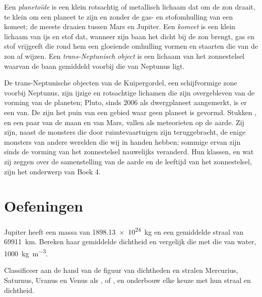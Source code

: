 \begin{definition}\label{def:b1:comparative-planetology:small-bodies}
Een \emph{planetoïde} is een klein rotsachtig of metallisch lichaam dat om de zon draait, te klein
om een planeet te zijn en zonder de gas- en stofomhulling van een komeet; de meeste draaien tussen Mars en Jupiter.
Een \emph{komeet} is een klein lichaam van ijs en stof dat, wanneer zijn baan het dicht bij de zon
brengt, gas en stof vrijgeeft die rond hem een gloeiende omhulling vormen en staarten die van de zon af wijzen. Een
\emph{trans-Neptunisch object} is een lichaam van het zonnestelsel waarvan de baan
gemiddeld voorbij die van Neptunus ligt.
\end{definition}

De trans-Neptunische objecten van de Kuipergordel, een schijfvormige zone voorbij Neptunus, zijn ijzige en
rotsachtige lichamen die zijn overgebleven van de vorming van de planeten; Pluto, sinds 2006 als dwergplaneet
aangemerkt, is er een van. De  zijn het puin van een gebied waar geen planeet is gevormd. Stukken
, en een paar van de maan en van Mars, vallen als meteorieten op de aarde. Zij zijn, naast de
monsters die door ruimtevaartuigen zijn teruggebracht, de enige monsters van andere werelden die wij in handen
hebben; sommige ervan zijn sinds de vorming van het zonnestelsel nauwelijks veranderd. Hun klassen, en wat zij
zeggen over de samenstelling van de aarde en de leeftijd van het zonnestelsel, zijn het onderwerp van Boek 4.

\section{Oefeningen}

\begin{exercise}[$\star$]\label{exo:b1:comparative-planetology:1}
Jupiter heeft een massa van \qty{1898.13e24}{kg} en een gemiddelde straal van \qty{69911}{km}. Bereken
haar gemiddelde dichtheid en vergelijk die met die van water, \qty{1000}{kg.m^{-3}}.
\end{exercise}

\begin{exercise}[$\star$]\label{exo:b1:comparative-planetology:2}
Classificeer aan de hand van de figuur van dichtheden en stralen Mercurius, Saturnus, Uranus en Venus als
,  of , en onderbouw elke keuze met hun straal en dichtheid.
\end{exercise}

